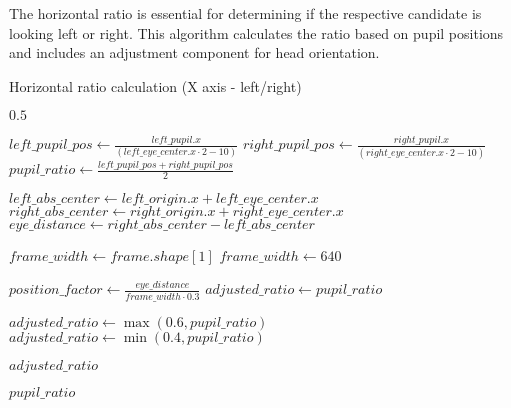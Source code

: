 \documentclass[12pt,a4paper]{article}
\begin{document}
The horizontal ratio is essential for determining if the respective candidate is looking left or right. This algorithm calculates the ratio based on pupil positions and includes an adjustment component for head orientation.

\begin{algorithm}[H]
    \caption{Horizontal ratio calculation (X axis - left/right)}
    \begin{algorithmic}[1]
            \State \Return $0.5$ 
        \EndIf
    
        \State $left\_pupil\_pos \gets \frac{left\_pupil.x}{(left\_eye\_center.x \cdot 2 - 10)}$ 
        \State $right\_pupil\_pos \gets \frac{right\_pupil.x}{(right\_eye\_center.x \cdot 2 - 10)}$
        \State $pupil\_ratio \gets \frac{left\_pupil\_pos + right\_pupil\_pos}{2}$ 
    
            \State $left\_abs\_center \gets left\_origin.x + left\_eye\_center.x$
            \State $right\_abs\_center \gets right\_origin.x + right\_eye\_center.x$
            \State $eye\_distance \gets right\_abs\_center - left\_abs\_center$
    
                \State $frame\_width \gets frame.shape[1]$ 
            \Else
                \State $frame\_width \gets 640$ 
            \EndIf
    
            \State $position\_factor \gets \frac{eye\_distance}{frame\_width \cdot 0.3}$ 
            \State $adjusted\_ratio \gets pupil\_ratio$ 
    
                \State $adjusted\_ratio \gets \max(0.6, pupil\_ratio)$ 
                \State $adjusted\_ratio \gets \min(0.4, pupil\_ratio)$ 
            \EndIf
    
            \State \Return $adjusted\_ratio$
        \EndIf
    
        \State \Return $pupil\_ratio$ 
    \EndProcedure
    \end{algorithmic}
    \end{algorithm}
    
\end{document}
